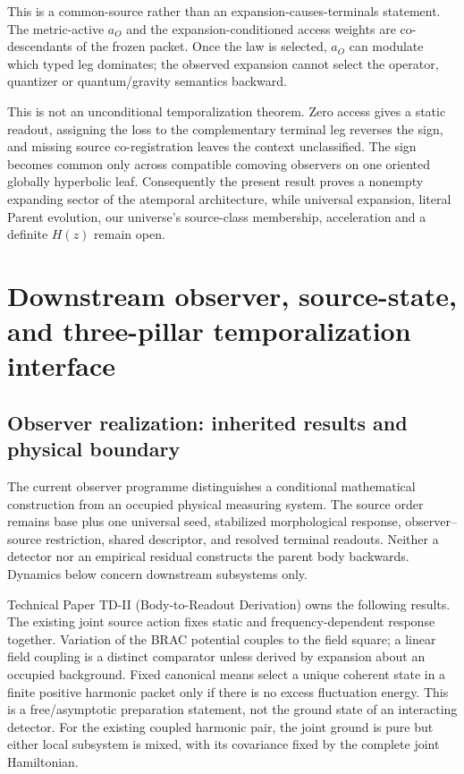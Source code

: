 \documentclass[11pt]{article}
\begin{document}
This is a common-source rather than an expansion-causes-terminals statement.
The metric-active $a_O$ and the expansion-conditioned access weights are
co-descendants of the frozen packet. Once the law is selected, $a_O$ can
modulate which typed leg dominates; the observed expansion cannot select the
operator, quantizer or quantum/gravity semantics backward.

This is not an unconditional temporalization theorem.  Zero access gives a
static readout, assigning the loss to the complementary terminal leg reverses
the sign, and missing source co-registration leaves the context unclassified.
The sign becomes common only across compatible comoving observers on one
oriented globally hyperbolic leaf.  Consequently the present result proves a
nonempty expanding sector of the atemporal architecture, while universal
expansion, literal Parent evolution, our universe's source-class membership,
acceleration and a definite $H(z)$ remain open.

\section{Downstream observer, source-state, and three-pillar temporalization interface}
\label{sec:downstream-ts-interface}

\subsection{Observer realization: inherited results and physical boundary}
\label{sec:observer-update-20260914}
The current observer programme distinguishes a conditional mathematical
construction from an occupied physical measuring system. The source order
remains base plus one universal seed, stabilized morphological response,
observer--source restriction, shared descriptor, and resolved terminal
readouts. Neither a detector nor an empirical residual constructs the parent
body backwards. Dynamics below concern downstream subsystems only.

Technical Paper TD-II (Body-to-Readout Derivation) owns the following
results. The existing joint source action fixes static and frequency-dependent
response together. Variation of the BRAC potential couples to the field
square; a linear field coupling is a distinct comparator unless derived by
expansion about an occupied background. Fixed canonical means select a unique
coherent state in a finite positive harmonic packet only if there is no excess
fluctuation energy. This is a free/asymptotic preparation statement, not the
ground state of an interacting detector. For the existing coupled harmonic
pair, the joint ground is pure but either local subsystem is mixed, with its
covariance fixed by the complete joint Hamiltonian.
\end{document}
